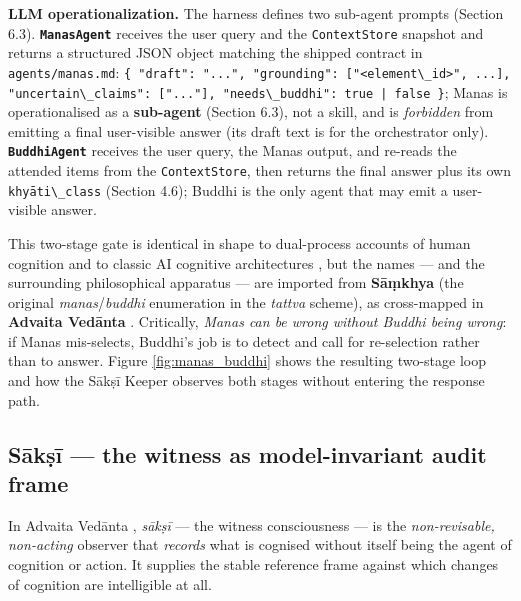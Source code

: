 \textbf{LLM operationalization.} The harness defines two sub-agent prompts (Section 6.3). \textbf{\passthrough{\lstinline!ManasAgent!}} receives the user query and the \passthrough{\lstinline!ContextStore!} snapshot and returns a structured JSON object matching the shipped contract in \passthrough{\lstinline!agents/manas.md!}: \passthrough{\lstinline!\{ "draft": "...", "grounding": ["<element\_id>", ...], "uncertain\_claims": ["..."], "needs\_buddhi": true | false \}!}; Manas is operationalised as a \textbf{sub-agent} (Section 6.3), not a skill, and is \emph{forbidden} from emitting a final user-visible answer (its draft text is for the orchestrator only). \textbf{\passthrough{\lstinline!BuddhiAgent!}} receives the user query, the Manas output, and re-reads the attended items from the \passthrough{\lstinline!ContextStore!}, then returns the final answer plus its own \passthrough{\lstinline!khyāti\_class!} (Section 4.6); Buddhi is the only agent that may emit a user-visible answer.

This two-stage gate is identical in shape to dual-process accounts of human cognition \citep{evans2003duality, kahneman2011thinking, sloman1996two} and to classic AI cognitive architectures \citep{laird1987soar, anderson1996actr, newell1990unified}, but the names --- and the surrounding philosophical apparatus --- are imported from \textbf{Sāṃkhya} (the original \emph{manas}/\emph{buddhi} enumeration in the \emph{tattva} scheme), as cross-mapped in \textbf{Advaita Vedānta} \citep{deutsch1969advaita, datta1932advaita, ramprasad2013advaita}. Critically, \emph{Manas can be wrong without Buddhi being wrong}: if Manas mis-selects, Buddhi's job is to detect and call for re-selection rather than to answer. Figure \ref{fig:manas_buddhi} shows the resulting two-stage loop and how the Sākṣī Keeper observes both stages without entering the response path.



\subsection{Sākṣī --- the witness as model-invariant audit frame}\label{sux101kux1e63ux12b-the-witness-as-model-invariant-audit-frame}

In Advaita Vedānta \citep{indich1980consciousness, fasching2009witness, ganeri2017concealed, sankaraupadesha}, \emph{sākṣī} --- the witness consciousness --- is the \emph{non-revisable, non-acting} observer that \emph{records} what is cognised without itself being the agent of cognition or action. It supplies the stable reference frame against which changes of cognition are intelligible at all.

